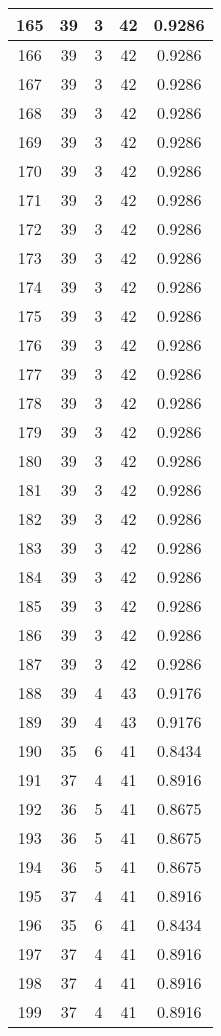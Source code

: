 \documentclass[letterpaper, 12pt]{article}
\begin{document}
\begin{longtable}{|c|c|c|c|c|}
\hline
165 & 39 & 3 & 42 & 0.9286 \\
\hline
166 & 39 & 3 & 42 & 0.9286 \\
\hline
167 & 39 & 3 & 42 & 0.9286 \\
\hline
168 & 39 & 3 & 42 & 0.9286 \\
\hline
169 & 39 & 3 & 42 & 0.9286 \\
\hline
170 & 39 & 3 & 42 & 0.9286 \\
\hline
171 & 39 & 3 & 42 & 0.9286 \\
\hline
172 & 39 & 3 & 42 & 0.9286 \\
\hline
173 & 39 & 3 & 42 & 0.9286 \\
\hline
174 & 39 & 3 & 42 & 0.9286 \\
\hline
175 & 39 & 3 & 42 & 0.9286 \\
\hline
176 & 39 & 3 & 42 & 0.9286 \\
\hline
177 & 39 & 3 & 42 & 0.9286 \\
\hline
178 & 39 & 3 & 42 & 0.9286 \\
\hline
179 & 39 & 3 & 42 & 0.9286 \\
\hline
180 & 39 & 3 & 42 & 0.9286 \\
\hline
181 & 39 & 3 & 42 & 0.9286 \\
\hline
182 & 39 & 3 & 42 & 0.9286 \\
\hline
183 & 39 & 3 & 42 & 0.9286 \\
\hline
184 & 39 & 3 & 42 & 0.9286 \\
\hline
185 & 39 & 3 & 42 & 0.9286 \\
\hline
186 & 39 & 3 & 42 & 0.9286 \\
\hline
187 & 39 & 3 & 42 & 0.9286 \\
\hline
188 & 39 & 4 & 43 & 0.9176 \\
\hline
189 & 39 & 4 & 43 & 0.9176 \\
\hline
190 & 35 & 6 & 41 & 0.8434 \\
\hline
191 & 37 & 4 & 41 & 0.8916 \\
\hline
192 & 36 & 5 & 41 & 0.8675 \\
\hline
193 & 36 & 5 & 41 & 0.8675 \\
\hline
194 & 36 & 5 & 41 & 0.8675 \\
\hline
195 & 37 & 4 & 41 & 0.8916 \\
\hline
196 & 35 & 6 & 41 & 0.8434 \\
\hline
197 & 37 & 4 & 41 & 0.8916 \\
\hline
198 & 37 & 4 & 41 & 0.8916 \\
\hline
199 & 37 & 4 & 41 & 0.8916 \\
\hline
\end{longtable}
\end{document}
